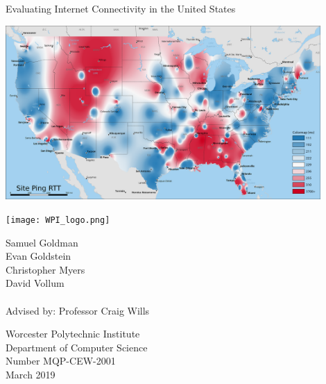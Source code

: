 \noindent\begin{minipage}{0.1\textwidth}
\end{minipage}
\begin{minipage}{0.9\textwidth}
    \begin{center}
        \Huge\noindent Evaluating Internet Connectivity in the United States
        
        \vspace{1.5in}
        \includegraphics[width=0.9\textwidth]{images/siteping/site_ping_rtt_idw.png}
    \end{center}
    \vspace{1in}
    \begin{minipage}{\textwidth}    
        \begin{flushright}
            \texttt{[image: WPI\_logo.png]} 
        \end{flushright}
    \end{minipage}
    \noindent\begin{minipage}{0.5\textwidth}
        \small
        Samuel Goldman \\
        Evan Goldstein \\
        Christopher Myers \\
        David Vollum \\ \\
        Advised by: Professor Craig Wills
    \end{minipage}
    \begin{minipage}{0.5\textwidth}
        \begin{flushright}
            \small
            Worcester Polytechnic Institute \\
            Department of Computer Science\\
            Number MQP-CEW-2001 \\
            March 2019
        \end{flushright}
    \end{minipage}
\end{minipage}